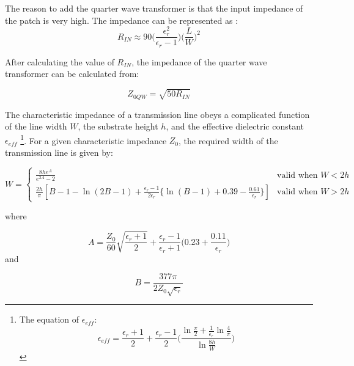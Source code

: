 \documentclass[12pt,a4paper]{report}
\begin{document}
The reason to add the quarter wave transformer is that the input impedance of the patch is very high. The impedance can be represented as \cite{input_impedance}:
\begin{equation}
    R_{IN} \approx 90 \bigg(\frac{\epsilon_r^2}{\epsilon_r - 1}\bigg) \bigg(\frac{L}{W} \bigg)^2
    \label{equ:patch_resistance}
\end{equation}

After calculating the value of $R_{IN}$, the impedance of the quarter wave transformer can be calculated from:

\begin{equation}
    Z_{0QW} = \sqrt{50R_{IN}}
    \label{equ:z0qw}
\end{equation}

\vspace{0.2cm}

The characteristic impedance of a transmission line obeys a complicated function of the line width $W$, the substrate height $h$, and the effective dielectric constant $\epsilon_{eff}$ \footnote{The equation of $\epsilon_{eff}$:\begin{equation}
    \epsilon_{eff} = \frac{\epsilon_r + 1}{2} + \frac{\epsilon_r - 1}{2} \bigg(\frac{\ln \frac{\pi}{2} + \frac{1}{\epsilon_r} \ln \frac{4}{\pi}}{\ln \frac{8h}{W}}\bigg)
    \label{equ:epsilon_eff}
\end{equation}}. For a given characteristic impedance $Z_0$, the required width of the transmission line is given by:

\begin{equation}
    W = \begin{cases}
        \frac{8h e^A}{e^{2A} - 2} &\text{valid when } W < 2h \\
        \frac{2h}{\pi}[B - 1 - \ln(2B - 1) + \frac{\epsilon_r - 1}{2 \epsilon_r} \{\ln(B - 1) + 0.39 - \frac{0.61}{\epsilon_r}\}] &\text{valid when } W > 2h
    \end{cases}
    \label{equ:w_calc}
\end{equation}

\vspace{0.2cm}

where

\begin{equation}
    A = \frac{Z_0}{60} \sqrt{\frac{\epsilon_r + 1}{2}} + \frac{\epsilon_r - 1}{\epsilon_r + 1}\bigg(0.23 + \frac{0.11}{\epsilon_r}\bigg)
    \label{equ:A}
\end{equation}
and

\begin{equation}
    B = \frac{377 \pi}{2 Z_0 \sqrt{\epsilon_r}}
    \label{equ:B}
\end{equation}
\end{document}
